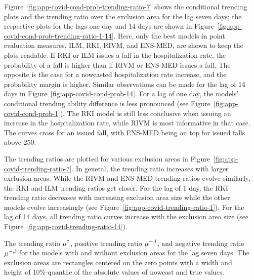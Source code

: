 Figure~\ref{fig:app-covid-cond-prob-trending-ratio-7} shows the conditional trending plots and the trending ratio over the exclusion area for the lag seven days; the respective plots for the lags one day and 14 days are shown in Figure~\ref{fig:app-covid-cond-prob-trending-ratio-1-14}.
Here, only the best models in point evaluation measures, ILM, RKI, RIVM, and ENS-MED, are shown to keep the plots readable.
If RKI or ILM issues a fall in the hospitalization rate, the probability of a fall is higher than if RIVM or ENS-MED issues a fall.
The opposite is the case for a nowcasted hospitalization rate increase, and the probability margin is higher. 
Similar observations can be made for the lag of 14 days in Figure~\ref{fig:app-covid-cond-prob-14}.
For a lag of one day, the models' conditional trending ability difference is less pronounced (see Figure~\ref{fig:app-covid-cond-prob-1}).
The RKI model is still less conclusive when issuing an increase in the hospitalization rate, while RIVM is most informative in that case.
The curves cross for an issued fall, with ENS-MED being on top for issued falls above 250.

The trending ratios are plotted for various exclusion areas in Figure~\ref{fig:app-covid-trending-ratio-7}.
In general, the trending ratio increases with larger exclusion areas.
While the RIVM and ENS-MED trending ratios evolve similarly, the RKI and ILM trending ratios get closer.
For the lag of 1 day, the RKI trending ratio decreases with increasing exclusion area size while the other models evolve increasingly (see Figure~\ref{fig:app-covid-trending-ratio-1}).
For the lag of 14 days, all trending ratio curves increase with the exclusion area size (see Figure~\ref{fig:app-covid-trending-ratio-14}).


\begin{table}
    \centering
    \tiny
    
    \caption{The trending ratio $\accl[7]$, positive trending ratio $\accpl[l]$, and negative trending ratio $\accml[l]$ for the models with and without exclusion areas for the lag seven days. The exclusion areas are rectangles centered on the zero points with a width and height of 10\%-quantile of the absolute values of nowcast and true values. }
    \label{tab:app-covid-trending-ratios-lag-7}
\end{table}

